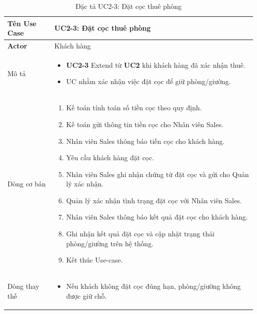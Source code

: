 \vspace{0.5cm}


\noindent
\begin{table}[H]
    \centering
\begin{tabularx}{\textwidth}{|>{\centering\arraybackslash\bfseries}m{3.5cm}|X|}
    \hline
    Tên Use Case & {\centering\textbf{UC2-3: Đặt cọc thuê phòng}\par} \\ 
    \hline
    
    Actor & Khách hàng \\ 
    \hline

    Mô tả &
    \vspace{0.2cm}
    \begin{itemize}[leftmargin=*, nosep, label=-]
        \item \textbf{UC2-3} Extend từ \textbf{UC2} khi khách hàng đã xác nhận thuê.
        \item UC nhằm xác nhận việc đặt cọc để giữ phòng/giường.
    \end{itemize} \\ 
    \hline
    
    Dòng cơ bản &
    \vspace{0.2cm}
    \begin{enumerate}[leftmargin=*, nosep]
        \item Kế toán tính toán số tiền cọc theo quy định.
        \item Kế toán gửi thông tin tiền cọc cho Nhân viên Sales.
        \item Nhân viên Sales thông báo tiền cọc cho khách hàng.
        \item Yêu cầu khách hàng đặt cọc.
        \item Nhân viên Sales ghi nhận chứng từ đặt cọc và gửi cho Quản lý xác nhận.
        \item Quản lý xác nhận tình trạng đặt cọc với Nhân viên Sales.
        \item Nhân viên Sales thông báo kết quả đặt cọc cho khách hàng.
        \item Ghi nhận kết quả đặt cọc và cập nhật trạng thái phòng/giường trên hệ thống.
        \item Kết thúc Use-case.
    \end{enumerate} \\ 
    \hline
    
    Dòng thay thế &
    \vspace{0.2cm}
    \begin{itemize}[leftmargin=*, nosep, label=-]
        \item Nếu khách không đặt cọc đúng hạn, phòng/giường không được giữ chỗ.
    \end{itemize} \\ 
    \hline
\end{tabularx}
\caption{Đặc tả UC2-3: Đặt cọc thuê phòng}
\end{table}
